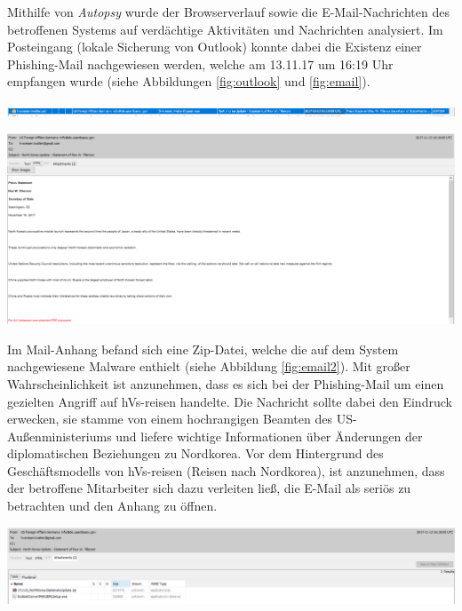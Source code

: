 Mithilfe von \textit{Autopsy} wurde der Browserverlauf sowie die E-Mail-Nachrichten des betroffenen Systems auf verdächtige Aktivitäten und Nachrichten analysiert. 
Im Posteingang (lokale Sicherung von Outlook) konnte dabei die Existenz einer Phishing-Mail nachgewiesen werden, welche am 13.11.17 um 16:19 Uhr empfangen wurde (siehe Abbildungen \ref{fig:outlook} und \ref{fig:email}).

\begin{center}
	\includegraphics[width=15.8cm]{figures/outlook.png}
	\label{fig:outlook}
\end{center}

\begin{center}
	\includegraphics[width=15.8cm]{figures/email.png}
	\label{fig:email}
\end{center}

Im Mail-Anhang befand sich eine Zip-Datei, welche die auf dem System nachgewiesene Malware  enthielt (siehe Abbildung \ref{fig:email2}).
Mit großer Wahrscheinlichkeit ist anzunehmen, dass es sich bei der Phishing-Mail um einen gezielten Angriff auf hVs-reisen handelte.
Die Nachricht sollte dabei den Eindruck erwecken, sie stamme von einem hochrangigen Beamten des US-Außenministeriums und liefere wichtige Informationen über Änderungen der diplomatischen Beziehungen zu Nordkorea.
Vor dem Hintergrund des Geschäftsmodells von hVs-reisen (Reisen nach Nordkorea), ist anzunehmen, dass der betroffene Mitarbeiter sich dazu verleiten ließ, die E-Mail als seriös zu betrachten und den Anhang zu öffnen.

\begin{center}
	\includegraphics[width=15.8cm]{figures/email2.png}
	\label{fig:email2}
\end{center}

